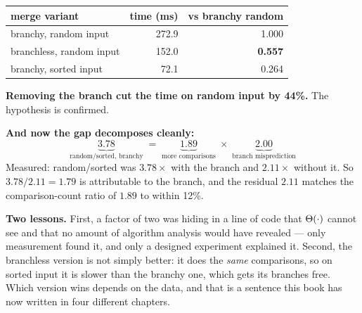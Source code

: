 \begin{worked}
\begin{center}
\begin{tabular}{@{}lrr@{}}
\toprule
\rowcolor{primary!15}
merge variant & time (ms) & vs branchy random \\
\midrule
branchy, random input    & 272.9 & 1.000 \\
branchless, random input & 152.0 & \textbf{0.557} \\
branchy, sorted input    &  72.1 & 0.264 \\
\bottomrule
\end{tabular}
\end{center}

\smallskip
\textbf{Removing the branch cut the time on random input by 44\%.} The
hypothesis is confirmed.

\smallskip
\textbf{And now the gap decomposes cleanly:}
\[ \underbrace{3.78}_{\text{random/sorted, branchy}}
   \;=\; \underbrace{1.89}_{\text{more comparisons}}
   \;\times\; \underbrace{2.00}_{\text{branch misprediction}} \]
Measured: random/sorted was $3.78\times$ with the branch and $2.11\times$
without it. So $3.78 / 2.11 = 1.79$ is attributable to the branch, and the
residual $2.11$ matches the comparison-count ratio of $1.89$ to within 12\%.

\smallskip
\textbf{Two lessons.} First, a factor of two was hiding in a line of code that
$\Theta(\cdot)$ cannot see and that no amount of algorithm analysis would have
revealed --- only measurement found it, and only a designed experiment
explained it. Second, the branchless version is not simply better: it does the
\emph{same} comparisons, so on sorted input it is slower than the branchy one,
which gets its branches free. Which version wins depends on the data, and that
is a sentence this book has now written in four different chapters.
\end{worked}

